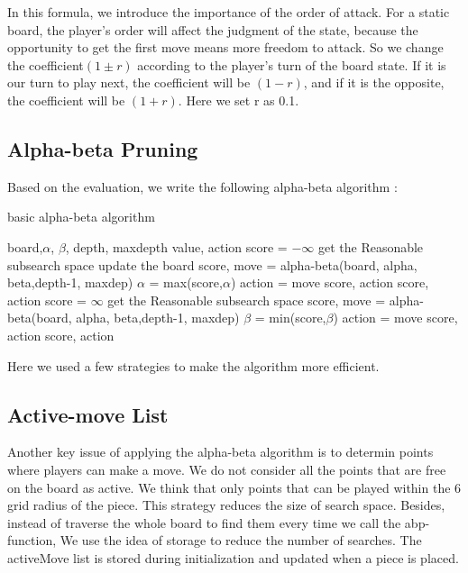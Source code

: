 \documentclass[a4paper, 12pt]{article} %
\begin{document}
\begin{multicols}{2}
    In this formula, we introduce the importance of the order of attack. For a static board, the player's order  will affect the judgment of the state, because the opportunity to get the first move means more freedom to attack. So we change the coefficient$(1\pm r)$ according to the player's turn of the board state. If it is our turn to play next, the coefficient will be $(1-r)$, and if it is the opposite, the coefficient will be $(1+r)$. Here we set r as 0.1.

  \subsection{Alpha-beta Pruning}
	Based on the evaluation, we write the following alpha-beta algorithm :
		
	\begin{algorithm}[H]
		\caption{basic alpha-beta algorithm}
		\begin{algorithmic}[1]
			\Require board,$\alpha$, $\beta$, depth, maxdepth
			\Ensure value, action
			  \State score = $-\infty$
				\State get the Reasonable subsearch space
				    \State update the board
				    \State score, move = alpha-beta(board, alpha, beta,depth-1, maxdep)
				    \State $\alpha$ = max(score,$\alpha$)
				    \State action = move
				    \If{$\alpha \ge \beta$}
				       \Return score, action
				    \EndIf
				  \EndFor
				  \Return score, action
			\Else
				\State score = $\infty$
				\State get the Reasonable subsearch space
				    \State score, move = alpha-beta(board, alpha, beta,depth-1, maxdep)
				    \State $\beta$ = min(score,$\beta$)
				    \State action = move
				    \If{$\alpha \ge \beta$}
				       \Return score, action
				     \EndIf
				   \EndFor
				   \Return score, action
			\EndIf
		\end{algorithmic}
	\end{algorithm}
  Here we used a few strategies to make the algorithm more efficient.
  \subsection{Active-move List}
  Another key issue of applying the alpha-beta algorithm is to determin points where players can make a move. We do not consider all the points that are free on the board as active. We think that only points that can be played within the 6 grid radius of the piece. This strategy reduces the size of search space. Besides, instead of traverse the whole board to find them every time we call the abp-function, We use the idea of storage to reduce the number of searches. The activeMove list is stored during initialization and updated when a piece is placed.
  

\end{multicols}
\end{document}
